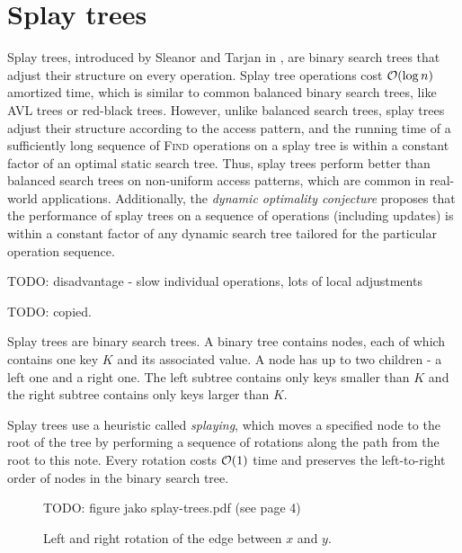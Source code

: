 \chapter{Splay trees}
Splay trees, introduced by Sleanor and Tarjan in \cite{splay}, are
binary search trees that adjust their structure on every operation.
Splay tree operations cost $\mathcal{O}(\log n)$ amortized time, which is
similar to common balanced binary search trees, like AVL trees or
red-black trees.
However, unlike balanced search trees, splay trees adjust their structure
according to the access pattern, and the running time of a sufficiently long
sequence of \textsc{Find} operations on a splay tree is within a constant
factor of an optimal static search tree.
Thus, splay trees perform better than balanced search trees on non-uniform
access patterns, which are common in real-world applications.
Additionally, the \textit{dynamic optimality conjecture} proposes that
the performance of splay trees on a sequence of operations (including updates)
is within a constant factor of any dynamic search tree tailored for
the particular operation sequence.

TODO: disadvantage - slow individual operations, lots of local adjustments

TODO: copied.

Splay trees are binary search trees. A binary tree contains nodes, each of which
contains one key $K$ and its associated value.
A node has up to two children - a left one and a right one.
The left subtree contains only keys smaller than $K$ and the right subtree
contains only keys larger than $K$.


Splay trees use a heuristic called \textit{splaying}, which moves a specified
node to the root of the tree by performing a sequence of rotations along the
path from the root to this note. Every rotation costs $\mathcal{O}(1)$ time and preserves
the left-to-right order of nodes in the binary search tree.

\begin{figure}
\centering
TODO: figure jako splay-trees.pdf (see page 4)
\caption{Left and right rotation of the edge between $x$ and $y$.}
\end{figure}

